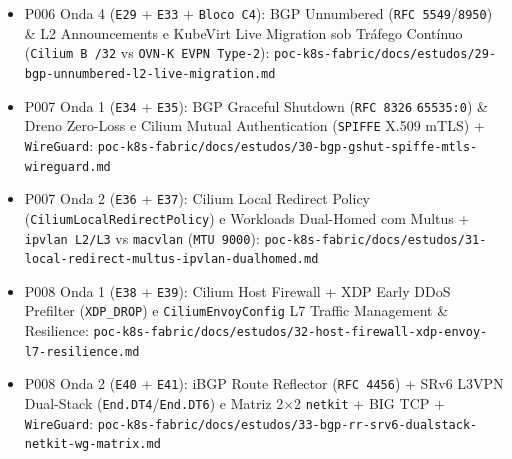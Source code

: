 \documentclass[12pt,openany,oneside,a4paper,chapter=TITLE,english,brazil]{abntex2}
\begin{document}
\begin{apendicesenv}
\begin{itemize}
\item
  P006 Onda 4 (\texttt{E29} + \texttt{E33} + \texttt{Bloco C4}): BGP Unnumbered (\texttt{RFC 5549}/\texttt{8950}) \& L2 Announcements e KubeVirt Live Migration sob Tráfego Contínuo (\texttt{Cilium B /\allowbreak{}32} vs \texttt{OVN-{}\allowbreak{}K EVPN Type-{}\allowbreak{}2}): \texttt{poc-{}\allowbreak{}k8s-{}\allowbreak{}fabric/\allowbreak{}docs/\allowbreak{}estudos/\allowbreak{}29-{}\allowbreak{}bgp-{}\allowbreak{}unnumbered-{}\allowbreak{}l2-{}\allowbreak{}live-{}\allowbreak{}migration.\allowbreak{}md}
\item
  P007 Onda 1 (\texttt{E34} + \texttt{E35}): BGP Graceful Shutdown (\texttt{RFC 8326} \texttt{65535:\allowbreak{}0}) \& Dreno Zero-Loss e Cilium Mutual Authentication (\texttt{SPIFFE} X.509 mTLS) + \texttt{Wire\allowbreak{}Guard}: \texttt{poc-{}\allowbreak{}k8s-{}\allowbreak{}fabric/\allowbreak{}docs/\allowbreak{}estudos/\allowbreak{}30-{}\allowbreak{}bgp-{}\allowbreak{}gshut-{}\allowbreak{}spiffe-{}\allowbreak{}mtls-{}\allowbreak{}wireguard.\allowbreak{}md}
\item
  P007 Onda 2 (\texttt{E36} + \texttt{E37}): Cilium Local Redirect Policy (\texttt{Cilium\allowbreak{}Local\allowbreak{}Redirect\allowbreak{}Policy}) e Workloads Dual-Homed com Multus + \texttt{ipvlan L2/\allowbreak{}L3} vs \texttt{macvlan} (\texttt{MTU 9000}): \texttt{poc-{}\allowbreak{}k8s-{}\allowbreak{}fabric/\allowbreak{}docs/\allowbreak{}estudos/\allowbreak{}31-{}\allowbreak{}local-{}\allowbreak{}redirect-{}\allowbreak{}multus-{}\allowbreak{}ipvlan-{}\allowbreak{}dualhomed.\allowbreak{}md}
\item
  P008 Onda 1 (\texttt{E38} + \texttt{E39}): Cilium Host Firewall + XDP Early DDoS Prefilter (\texttt{XDP\_\allowbreak{}DROP}) e \texttt{Cilium\allowbreak{}Envoy\allowbreak{}Config} L7 Traffic Management \& Resilience: \texttt{poc-{}\allowbreak{}k8s-{}\allowbreak{}fabric/\allowbreak{}docs/\allowbreak{}estudos/\allowbreak{}32-{}\allowbreak{}host-{}\allowbreak{}firewall-{}\allowbreak{}xdp-{}\allowbreak{}envoy-{}\allowbreak{}l7-{}\allowbreak{}resilience.\allowbreak{}md}
\item
  P008 Onda 2 (\texttt{E40} + \texttt{E41}): iBGP Route Reflector (\texttt{RFC 4456}) + SRv6 L3VPN Dual-Stack (\texttt{End.\allowbreak{}DT4}/\texttt{End.\allowbreak{}DT6}) e Matriz 2×2 \texttt{netkit} + BIG TCP + \texttt{Wire\allowbreak{}Guard}: \texttt{poc-{}\allowbreak{}k8s-{}\allowbreak{}fabric/\allowbreak{}docs/\allowbreak{}estudos/\allowbreak{}33-{}\allowbreak{}bgp-{}\allowbreak{}rr-{}\allowbreak{}srv6-{}\allowbreak{}dualstack-{}\allowbreak{}netkit-{}\allowbreak{}wg-{}\allowbreak{}matrix.\allowbreak{}md}

\end{itemize}
\end{apendicesenv}
\end{document}
